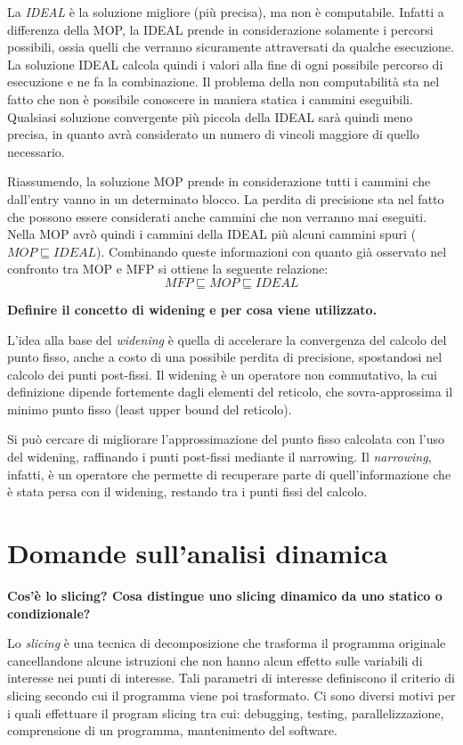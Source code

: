 \documentclass[a4paper,oneside,titlepage]{book}
\begin{document}
La \textit{IDEAL} è la soluzione migliore (più precisa), ma non è computabile. Infatti a differenza della MOP, la IDEAL prende in considerazione solamente i percorsi possibili, ossia quelli che verranno sicuramente attraversati da qualche esecuzione. La soluzione IDEAL calcola quindi i valori alla fine di ogni possibile percorso di esecuzione e ne fa la combinazione. Il problema della non computabilità sta nel fatto che non è possibile conoscere in maniera statica i cammini eseguibili. Qualsiasi soluzione convergente più piccola della IDEAL sarà quindi meno precisa, in quanto avrà considerato un numero di vincoli maggiore di quello necessario.

Riassumendo, la soluzione MOP prende in considerazione tutti i cammini che dall'entry vanno in un determinato blocco. La perdita di precisione sta nel fatto che possono essere considerati anche cammini che non verranno mai eseguiti. Nella MOP avrò quindi i cammini della IDEAL più alcuni cammini spuri ($MOP \sqsubseteq IDEAL$). Combinando queste informazioni con quanto già osservato nel confronto tra MOP e MFP si ottiene la seguente relazione:
\[ MFP \sqsubseteq MOP \sqsubseteq IDEAL \]

\noindent
\textbf{Definire il concetto di widening e per cosa viene utilizzato.}

L'idea alla base del \textit{widening} è quella di accelerare la convergenza del calcolo del punto fisso, anche a costo di una possibile perdita di precisione, spostandosi nel calcolo
dei punti post-fissi. Il widening è un operatore non commutativo, la cui definizione dipende fortemente dagli elementi del reticolo, che sovra-approssima il minimo punto fisso (least upper bound del reticolo).

Si può cercare di migliorare l'approssimazione del punto fisso calcolata con l'uso del widening, raffinando i punti post-fissi mediante il narrowing. Il \textit{narrowing}, infatti, è un operatore che permette di recuperare parte di quell'informazione che è stata persa con il widening, restando tra i punti fissi del calcolo.


\section{Domande sull'analisi dinamica}
\textbf{Cos'è lo slicing? Cosa distingue uno slicing dinamico da uno statico o condizionale?}

Lo \textit{slicing} è una tecnica di decomposizione che trasforma il programma originale cancellandone alcune istruzioni che non hanno alcun effetto sulle variabili di interesse nei punti di interesse. Tali parametri di interesse definiscono il criterio di slicing secondo cui il programma viene poi trasformato. Ci sono diversi motivi per i quali effettuare il program slicing tra cui: debugging, testing, parallelizzazione, comprensione di un programma, mantenimento del software.
\end{document}
